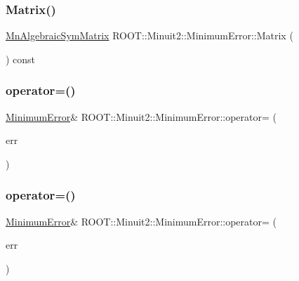\subsubsection{\texorpdfstring{Matrix()}{Matrix()}\hspace{0.1cm}{\footnotesize\ttfamily [2/2]}}
{\footnotesize\ttfamily \mbox{\hyperlink{namespaceROOT_1_1Minuit2_a9e74ad97f5537a2e80e52b04d98ecc6e}{Mn\+Algebraic\+Sym\+Matrix}} R\+O\+O\+T\+::\+Minuit2\+::\+Minimum\+Error\+::\+Matrix (\begin{DoxyParamCaption}{ }\end{DoxyParamCaption}) const\hspace{0.3cm}{\ttfamily [inline]}}

\mbox{\label{classROOT_1_1Minuit2_1_1MinimumError_a991c1899c07aa31f7a61d77b648c07ad}} 
\subsubsection{\texorpdfstring{operator=()}{operator=()}\hspace{0.1cm}{\footnotesize\ttfamily [1/2]}}
{\footnotesize\ttfamily \mbox{\hyperlink{classROOT_1_1Minuit2_1_1MinimumError}{Minimum\+Error}}\& R\+O\+O\+T\+::\+Minuit2\+::\+Minimum\+Error\+::operator= (\begin{DoxyParamCaption}\item[{const \mbox{\hyperlink{classROOT_1_1Minuit2_1_1MinimumError}{Minimum\+Error}} \&}]{err }\end{DoxyParamCaption})\hspace{0.3cm}{\ttfamily [inline]}}

\mbox{\label{classROOT_1_1Minuit2_1_1MinimumError_a991c1899c07aa31f7a61d77b648c07ad}} 
\subsubsection{\texorpdfstring{operator=()}{operator=()}\hspace{0.1cm}{\footnotesize\ttfamily [2/2]}}
{\footnotesize\ttfamily \mbox{\hyperlink{classROOT_1_1Minuit2_1_1MinimumError}{Minimum\+Error}}\& R\+O\+O\+T\+::\+Minuit2\+::\+Minimum\+Error\+::operator= (\begin{DoxyParamCaption}\item[{const \mbox{\hyperlink{classROOT_1_1Minuit2_1_1MinimumError}{Minimum\+Error}} \&}]{err }\end{DoxyParamCaption})\hspace{0.3cm}{\ttfamily [inline]}}



